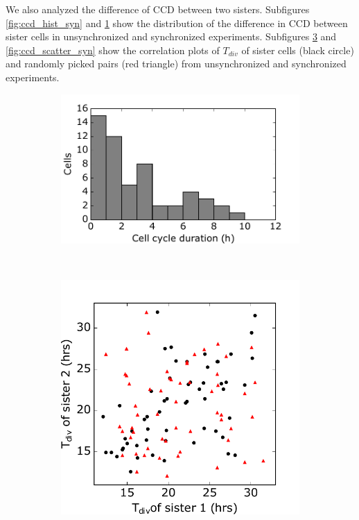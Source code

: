 \documentclass[pdftex,12pt,a4paper]{report}
\begin{document}
We also analyzed the difference of CCD between two sisters. Subfigures \ref{fig:ccd_hist_syn} and \ref{fig:ccd_hist_unsyn} show the distribution of the difference in CCD between sister cells in unsynchronized and synchronized experiments. Subfigures \ref{fig:ccd_scatter_unsyn} and \ref{fig:ccd_scatter_syn} show the correlation plots of $T_{div}$ of sister cells (black circle) and randomly picked pairs (red triangle) from unsynchronized and synchronized experiments.

\begin{figure}[H]
\centering
\begin{subfigure}{.4\textwidth}
  \centering
  \includegraphics[width=\textwidth]{images/ccd_hist_unsyn.pdf}
  \caption{}
  \label{fig:ccd_hist_unsyn}
\end{subfigure}
~
\begin{subfigure}{.4\textwidth}
  \centering
  \includegraphics[width=\textwidth]{images/ccd_scatter_unsyn.pdf}
  \caption{}
  \label{fig:ccd_scatter_unsyn}
\end{subfigure}


\end{figure}
\end{document}
